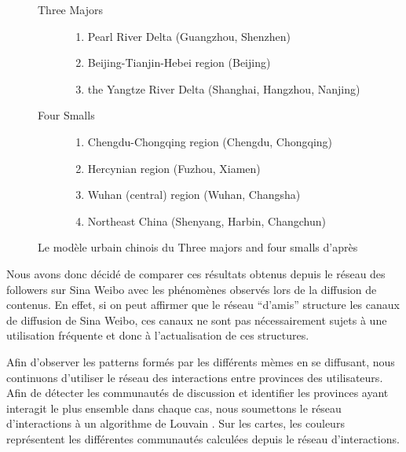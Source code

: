 \begin{figure}[H]
    \centering
    
    \begin{description}
    \item[Three Majors]
      \begin{enumerate}
      \item Pearl River Delta (Guangzhou, Shenzhen)
      \item Beijing-Tianjin-Hebei region (Beijing)
      \item the Yangtze River Delta (Shanghai, Hangzhou, Nanjing)
      \end{enumerate}

    \item[Four Smalls]
      \begin{enumerate}
      \item Chengdu-Chongqing region (Chengdu, Chongqing)
      \item Hercynian region (Fuzhou, Xiamen)
      \item Wuhan (central) region (Wuhan, Changsha)
      \item Northeast China (Shenyang, Harbin, Changchun)
      \end{enumerate}

    \end{description}

   \caption{
      Le mod\`ele urbain chinois du Three majors and four smalls d{\textquoteright}apr\`es \cite{Zhen2013}
    }
\end{figure}


Nous avons donc d\'ecid\'e de comparer ces r\'esultats obtenus depuis le
r\'eseau des followers sur Sina Weibo avec les ph\'enom\`enes
observ\'es lors de la diffusion de contenus. En effet, si on peut
affirmer que le r\'eseau
{\textquotedblleft}d{\textquoteright}amis{\textquotedblright} structure
les canaux de diffusion de Sina Weibo, ces canaux ne sont pas
n\'ecessairement sujets \`a une utilisation fr\'equente et donc \`a
l{\textquoteright}actualisation de ces structures.


Afin d{\textquoteright}observer les patterns form\'es par les
diff\'erents m\`emes en se diffusant, nous continuons
d{\textquoteright}utiliser le r\'eseau des interactions entre provinces
des utilisateurs. Afin de d\'etecter les communaut\'es de discussion et
identifier les provinces ayant interagit le plus ensemble dans chaque
cas, nous soumettons le r\'eseau d{\textquoteright}interactions \`a un
algorithme de Louvain \citep{Blondel2008}. Sur les cartes, les
couleurs repr\'esentent les diff\'erentes communaut\'es calcul\'ees
depuis le r\'eseau d{\textquoteright}interactions.

